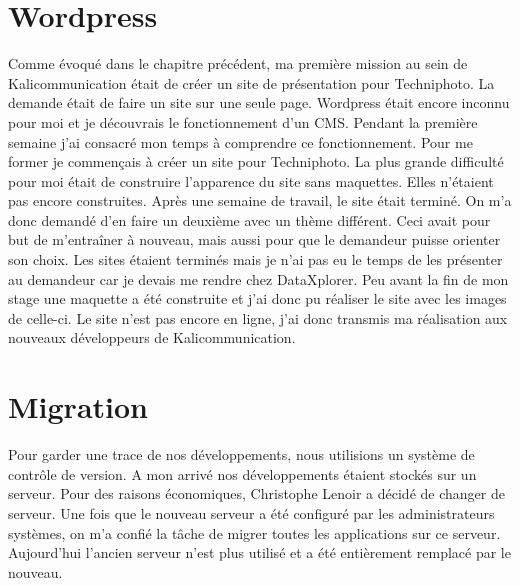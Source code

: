 
\section{Wordpress}
Comme évoqué dans le chapitre précédent, ma première mission au sein de Kalicommunication était de créer un site de présentation pour Techniphoto. La demande était de faire un site sur une seule page. Wordpress était encore inconnu pour moi et je découvrais le fonctionnement d'un CMS. Pendant la première semaine j'ai consacré mon temps à comprendre ce fonctionnement. Pour me former je commençais à créer un site pour Techniphoto. La plus grande difficulté pour moi était de construire l'apparence du site sans maquettes. Elles n'étaient pas encore construites.\newline
Après une semaine de travail, le site était terminé. On m'a donc demandé d'en faire un deuxième avec un thème différent. Ceci avait pour but de m'entraîner à nouveau, mais aussi pour que le demandeur puisse orienter son choix.\newline
Les sites étaient terminés mais je n'ai pas eu le temps de les présenter au demandeur car je devais me rendre chez DataXplorer.
Peu avant la fin de mon stage une maquette a été construite et j'ai donc pu réaliser le site avec les images de celle-ci. Le site n'est pas encore en ligne, j'ai donc transmis ma réalisation aux nouveaux développeurs de Kalicommunication.

\section{Migration}
Pour garder une trace de nos développements, nous utilisions un système de contrôle de version. A mon arrivé nos développements étaient stockés sur un serveur. Pour des raisons économiques, Christophe Lenoir a décidé de changer de serveur. Une fois que le nouveau serveur a été configuré par les administrateurs systèmes, on m'a confié la tâche de migrer toutes les applications sur ce serveur. Aujourd'hui l'ancien serveur n'est plus utilisé et a été entièrement remplacé par le nouveau.

